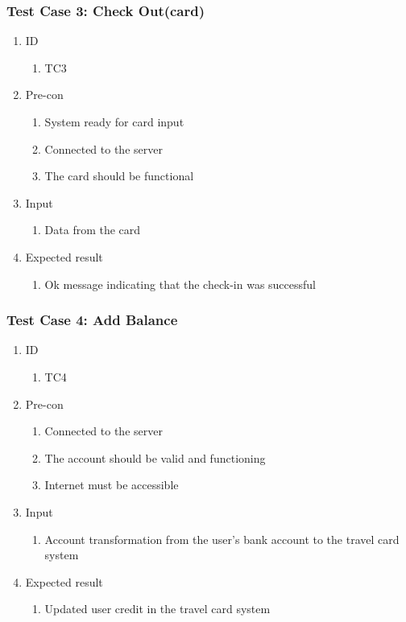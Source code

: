 \subsubsection*{Test Case 3: Check Out(card)}
\begin{enumerate}
	\item ID
		\begin{enumerate}
			\item TC3
		\end{enumerate}
	\item Pre-con
		\begin{enumerate}
			\item System ready for card input
			\item Connected to the server
			\item The card should be functional
		\end{enumerate}
	\item Input
		\begin{enumerate}
			\item Data from the card
		\end{enumerate}
	\item Expected result
		\begin{enumerate}
			\item Ok message indicating that the check-in was successful 
		\end{enumerate}
\end{enumerate}


\subsubsection*{Test Case 4: Add Balance}
\begin{enumerate}
	\item ID
		\begin{enumerate}
			\item TC4
		\end{enumerate}
	\item Pre-con
		\begin{enumerate}
			\item Connected to the server
			\item The account should be valid and functioning
			\item Internet must be accessible
		\end{enumerate}
	\item Input
		\begin{enumerate}
			\item Account transformation from the user's bank account to the travel card system
		\end{enumerate}
	\item Expected result
		\begin{enumerate}
			\item Updated user credit in the travel card system
		\end{enumerate}
\end{enumerate}



